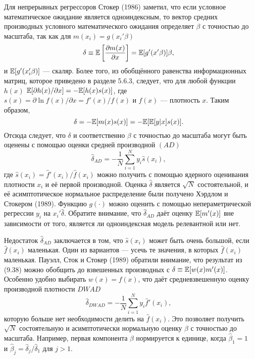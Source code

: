 Для непрерывных регрессоров Стокер (1986) заметил, что если условное математическое ожидание является одноиндексным, то вектор средних производных условного математического ожидания определяет $\beta$ с точностью до масштаба, так как для $m(x_i) = g(x_i'\beta)$
\begin{equation}
\delta \equiv \mathbb{E}\left[ \frac{\partial{m(x)}}{\partial{x}} \right] = \mathbb{E}[g'(x'\beta)]\beta,
\end{equation}
и $\mathbb{E}[g'(x_i'\beta)]$ --- скаляр. Более того, из обобщённого равенства информационных матриц, которое приведено в разделе 5.6.3, следует, что для любой функции $h(x)$ $\mathbb{E}[\partial{h(x)}/\partial{x}] = - \mathbb{E}[h(x)s(x)]$, где $s(x) = \partial{\ln f(x)}/\partial{x} = f'(x)/f(x)$ и $f(x)$ --- плотность $x$. Таким образом, 
\begin{equation}
\delta = -\mathbb{E}[m(x)s(x)] = - \mathbb{E}[\mathbb{E}[y|x]s(x)].
\end{equation}
Отсюда следует, что $\delta$ и соответственно $\beta$ с точностью до масштаба могут быть оценены с помощью оценки средней производной $(AD)$
\begin{equation}
\hat{\delta}_{AD} = - \frac{1}{N} \sum_{i=1}^N y_i \hat{s}(x_i),
\end{equation}
где $\hat{s}(x_i) = \hat{f}'(x_i)/\hat{f}(x_i)$ можно получить с помощью ядерного оценивания плотности $x_i$ и её первой производной. Оценка $\hat{\delta}$ является $\sqrt{N}$ состоятельной, и её асимптотическое нормальное распределение были получено Хэрдлом и Стокером (1989). Функцию $g(\cdot)$ можно оценить с помощью непераметрической регрессии $y_i$ на $x_i'\hat{\delta}$. Обратите внимание, что $\hat{\delta}_{AD}$ даёт оценку $\mathbb{E}[m'(x)]$ вне зависимости от того, является ли одноиндексная модель релевантной или нет.

Недостаток $\hat{\delta}_{AD}$ заключается в том, что $\hat{s}(x_i)$ может быть очень большой, если $\hat{f}(x_i)$ маленькая. Один из вариантов --- усечь те значения, в которых $\hat{f}(x_i)$ маленькая. Пауэлл, Сток и Стокер (1989) обратили внимание, что результат из (9.38) можно обобщить до взвешенных производных с $\delta \equiv \mathbb{E}[w(x)m'(x)]$. Особенно удобно выбирать $w(x) = f(x)$, что даёт средневзвешенную оценку производной плотности $DWAD$
\begin{equation}
\hat{\delta}_{DWAD} = - \frac{1}{N} \sum_{i=1}^N y_i \hat{f}'(x_i),
\end{equation}
которую больше нет необходимости делить на $\hat{f}(x_i)$. Это позволяет получить $\sqrt{N}$ состоятельную и асимптотически нормальную оценку $\beta$ с точностью до масштаба. Например, первая компонента $\beta$ нормируется к единице, когда $\hat{\beta}_1 = 1$ и $\hat{\beta}_j = \hat{\delta}_j/\hat{\delta}_1$ для $j > 1$.

